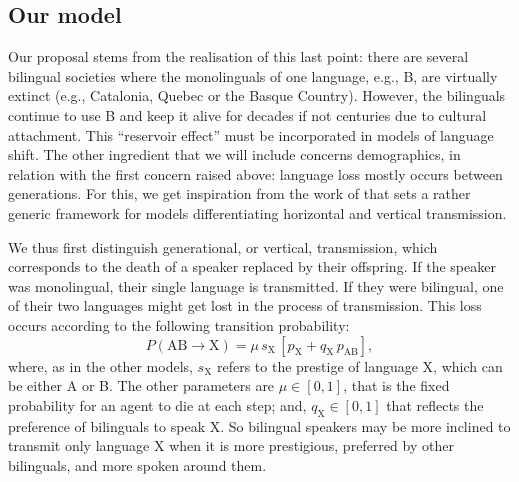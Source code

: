 \documentclass[../thesis.tex]{subfiles}
\begin{document}
\subsection{Our model}
Our proposal stems from the realisation of this last point: there are several bilingual
societies where the monolinguals of one language, e.g., B, are virtually extinct (e.g.,
Catalonia, Quebec or the Basque Country). However, the bilinguals continue to use B and
keep it alive for decades if not centuries due to cultural attachment. This ``reservoir
effect'' must be incorporated in models of language shift. The other ingredient that we
will include concerns demographics, in relation with the first concern raised above:
language loss mostly occurs between generations. For this, we get inspiration from the
work of \cite{MinettModellingEndangered2008} that sets a rather generic framework for
models differentiating horizontal and vertical transmission.

We thus first distinguish generational, or vertical, transmission, which corresponds to
the death of a speaker replaced by their offspring. If the speaker was monolingual,
their single language is transmitted. If they were bilingual, one of their two languages
might get lost in the process of transmission. This loss occurs according to the
following transition probability:
\begin{equation}
  P (\text{AB} \rightarrow \text{X}) = \mu \, s_\text{X} \, \left[ p_{\text{X}} + q_\text{X} \, p_{\text{AB}} \right],
\end{equation}
where, as in the other models, $s_\text{X}$ refers to the prestige of language X, which
can be either A or B. The other parameters are $\mu \in [0, 1]$, that is the fixed
probability for an agent to die at each step; and, $q_\text{X} \in [0, 1]$ that reflects
the preference of bilinguals to speak X. So bilingual speakers may be more inclined to
transmit only language X when it is more prestigious, preferred by other bilinguals, and
more spoken around them.
\end{document}
